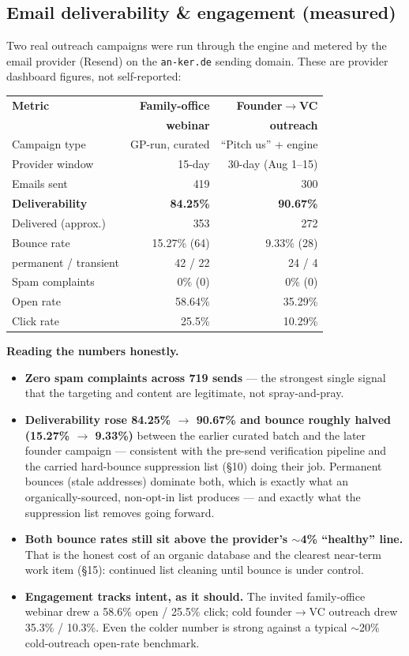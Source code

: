 \documentclass[11pt]{article}
\begin{document}
\subsection{Email deliverability \& engagement (measured)}
Two real outreach campaigns were run through the engine and metered by the email
provider (Resend) on the \texttt{an-ker.de} sending domain. These are provider
dashboard figures, not self-reported:
\begin{center}\footnotesize
\begin{tabular}{@{}lrr@{}}
\toprule
\textbf{Metric} & \textbf{Family-office} & \textbf{Founder$\to$VC}\\
 & \textbf{webinar} & \textbf{outreach}\\
\midrule
Campaign type & GP-run, curated & ``Pitch us'' + engine\\
Provider window & 15-day & 30-day (Aug 1--15)\\
Emails sent & 419 & 300\\
\textbf{Deliverability} & \textbf{84.25\%} & \textbf{90.67\%}\\
Delivered (approx.) & 353 & 272\\
Bounce rate & 15.27\% (64) & 9.33\% (28)\\
\quad permanent / transient & 42 / 22 & 24 / 4\\
Spam complaints & 0\% (0) & 0\% (0)\\
Open rate & 58.64\% & 35.29\%\\
Click rate & 25.5\% & 10.29\%\\
\bottomrule
\end{tabular}
\end{center}
\textbf{Reading the numbers honestly.}
\begin{itemize}[leftmargin=1.2em,itemsep=1pt]
\item \textbf{Zero spam complaints across 719 sends} --- the strongest single
signal that the targeting and content are legitimate, not spray-and-pray.
\item \textbf{Deliverability rose 84.25\% $\to$ 90.67\% and bounce roughly halved
(15.27\% $\to$ 9.33\%)} between the earlier curated batch and the later founder
campaign --- consistent with the pre-send verification pipeline and the carried
hard-bounce suppression list (\S10) doing their job. Permanent bounces (stale
addresses) dominate both, which is exactly what an organically-sourced,
non-opt-in list produces --- and exactly what the suppression list removes going
forward.
\item \textbf{Both bounce rates still sit above the provider's $\sim$4\%
``healthy'' line.} That is the honest cost of an organic database and the clearest
near-term work item (\S15): continued list cleaning until bounce is under
control.
\item \textbf{Engagement tracks intent, as it should.} The invited family-office
webinar drew a 58.6\% open / 25.5\% click; cold founder$\to$VC outreach drew
35.3\% / 10.3\%. Even the colder number is strong against a typical
$\sim$20\% cold-outreach open-rate benchmark.
\end{itemize}
\end{document}
